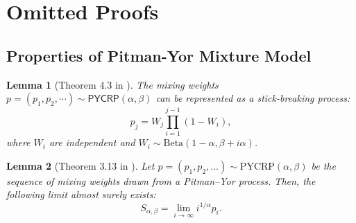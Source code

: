 \documentclass[11pt]{article}
\theoremstyle{plain}
\newtheorem{theorem}{Theorem}[section]
\newtheorem{lemma}[theorem]{Lemma}
\theoremstyle{definition}
\newcommand{\PYMM}{\mathsf{PYMM}}
\newcommand{\PYCRP}{\mathsf{PYCRP}}
\begin{document}


\section{Omitted Proofs}
\label{app:Omitted Proofs}
\subsection{Properties of Pitman-Yor Mixture Model}
\label{subsec:PitmanYor}
\begin{lemma}[Theorem 4.3 in \cite{pitman2006combinatorial}]
\label{thm:PYP rank fre} 
The mixing weights $p=(p_1,p_2,\cdots)\sim\PYCRP(\alpha,\beta)$ can be represented as a stick-breaking process:
\[p_j=W_j\prod\limits_{i=1}^{j-1}(1-W_i),\]
where $W_i$ are independent and $W_i \sim \text{Beta}(1 - \alpha, \beta + i \alpha)$.
\end{lemma}
\begin{lemma}[Theorem 3.13 in \cite{pitman2006combinatorial}]
\label{lem:PYCRP fre}
Let \( p = (p_1, p_2, \dots) \sim \mathrm{PYCRP}(\alpha, \beta) \) be the sequence of mixing weights drawn from a Pitman–Yor process. Then, the following limit almost surely exists:
\[
S_{\alpha,\beta} = \lim_{i \to \infty} i^{1/\alpha} p_i.
\]
\end{lemma}
\end{document}
